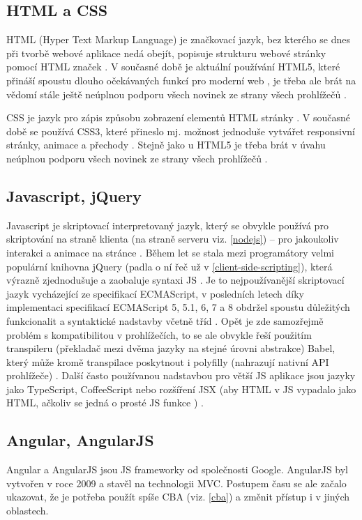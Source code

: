         \subsection{HTML a CSS}
        HTML (Hyper Text Markup Language) je značkovací jazyk, bez kterého se dnes při tvorbě webové aplikace nedá obejít, popisuje strukturu webové stránky pomocí HTML značek \cite{html1}. V současné době je aktuální používání HTML5, které přináší spoustu dlouho očekávaných funkcí pro moderní web \cite{html2}, je třeba ale brát na vědomí stále ještě neúplnou podporu všech novinek ze strany všech prohlížečů \cite{html3}.
        
        CSS je jazyk pro zápis způsobu zobrazení elementů HTML stránky \cite{css2}. V současné době se používá CSS3, které přineslo mj. možnost jednoduše vytvářet responsivní stránky, animace a přechody \cite{css3}. Stejně jako u HTML5 je třeba brát v úvahu neúplnou podporu všech novinek ze strany všech prohlížečů \cite{css1}.
        
        \subsection{Javascript, jQuery}\label{js}
        Javascript je skriptovací interpretovaný jazyk, který se obvykle používá pro skriptování na straně klienta (na straně serveru viz. \ref{nodejs}) -- pro jakoukoliv interakci a animace na stránce \cite{js2}. Během let se stala mezi programátory velmi populární knihovna jQuery (padla o ní řeč už v \ref{client-side-scripting}), která výrazně zjednodušuje a zaobaluje syntaxi JS \cite{scripting-upwork}. Je to nejpoužívanější skriptovací jazyk vycházející ze specifikací ECMAScript, v posledních letech díky implementaci specifikací ECMAScript 5, 5.1, 6, 7 a 8 obdržel spoustu důležitých funkcionalit a syntaktické nadstavby včetně tříd \cite{js3}. Opět je zde samozřejmě problém s kompatibilitou v prohlížečích, to se ale obvykle řeší použitím transpileru (překladač mezi dvěma jazyky na stejné úrovni abstrakce) Babel, který může kromě transpilace poskytnout i polyfilly (nahrazují nativní API prohlížeče) \cite{js4} \cite{js1}. Další často používanou nadstavbou pro větší JS aplikace jsou jazyky jako TypeScript, CoffeeScript \cite{js5} nebo rozšíření JSX (aby HTML v JS vypadalo jako HTML, ačkoliv se jedná o prosté JS funkce \cite{js-fw3}) \cite{js6}.
        
        \subsection{Angular, AngularJS}\label{sec:angular}
        Angular a AngularJS jsou JS frameworky od společnosti Google. AngularJS byl vytvořen v roce 2009 a stavěl na technologii MVC. Postupem času se ale začalo ukazovat, že je potřeba použít spíše CBA (viz. \ref{cba}) a změnit přístup i v jiných oblastech. \cite{angular1}
        
